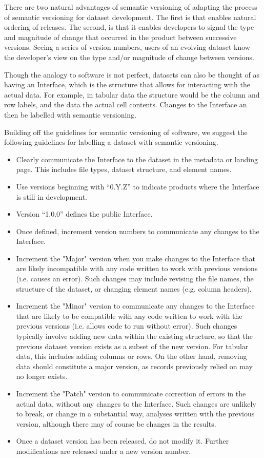 \documentclass[a4paper,num-refs]{assets/oup-contemporary}
\begin{document}
There are two natural advantages of semantic versioning of adapting the process of semantic versioning for dataset development. The first is that enables natural ordering of releases. The second, is that it enables developers to signal the type and magnitude of change that occurred in the product between successive versions. Seeing a series of version numbers, users of an evolving dataset know the developer's view on the type and/or magnitude of change between versions. 

Though the analogy to software is not perfect, datasets can also be thought of as having an Interface, which is the structure that allows for interacting with the actual data. For example, in tabular data the structure would be the column and row labels, and the data the actual cell contents. Changes to the Interface an then be labelled with semantic versioning. 

Building off the guidelines for semantic versioning of software, we suggest the following guidelines for labelling a dataset with semantic versioning.
\begin{itemize}
  \item Clearly communicate the Interface to the dataset in the metadata or landing page. This includes file types, dataset structure, and element names.
  \item Use versions beginning with ``0.Y.Z'' to indicate products where the Interface is still in development.
  \item Version ``1.0.0'' defines the public Interface. 
  \item Once defined, increment version numbers to communicate any changes to the Interface.
  \item Increment the "Major" version when you make changes to the Interface that are likely incompatible with any code written to work with previous versions (i.e. causes an error). Such changes may include revising the file names, the structure of the dataset, or changing element names (e.g. column headers). 
  \item Increment the "Minor" version to communicate any changes to the Interface that are likely to be compatible with any code written to work with the previous versions (i.e. allows code to run without error). Such changes typically involve adding new data within the existing structure, so that the previous dataset version exists as a subset of the new version. For tabular data, this includes adding columns or rows. On the other hand, removing data should constitute a major version, as records previously relied on may no longer exists.
  \item Increment the "Patch" version to communicate correction of errors in the actual data, without any changes to the Interface. Such changes are unlikely to break, or change in a substantial way, analyses written with the previous version, although there may of course be changes in the results.
  \item Once a dataset version has been released, do not modify it. Further modifications are released under a new version number.
\end{itemize}
\end{document}
